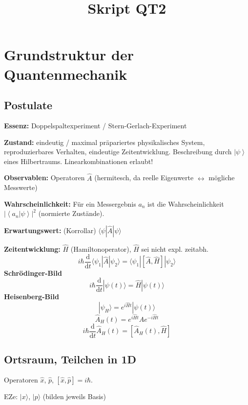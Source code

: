 \documentclass[11pt,a4paper]{report}
\title{Skript QT2}
\begin{document}
\maketitle

\tableofcontents

\chapter{Grundstruktur der Quantenmechanik}

\section{Postulate}

\textbf{Essenz:} Doppelspaltexperiment / Stern-Gerlach-Experiment\par 
\textbf{Zustand:} eindeutig / maximal präpariertes physikalisches System, reproduzierbares Verhalten, eindeutige Zeitentwicklung. Beschreibung durch $\left|\psi\right\rangle$ eines Hilbertraums. Linearkombinationen erlaubt!\par 
\textbf{Observablen:} Operatoren $\hat{A}$ (hermitesch, da reelle Eigenwerte $\leftrightarrow$ mögliche Messwerte)\par 
\textbf{Wahrscheinlichkeit:} Für ein Messergebnis $a_n$ ist die Wahrscheinlichkeit $\left|\left\langle a_n|\psi\right\rangle\right|^2$ (normierte Zustände).\par 
\textbf{Erwartungswert:} (Korrollar) $\langle\psi|\hat{A}|\psi\rangle$\par 
\textbf{Zeitentwicklung:} $\hat{H}$ (Hamiltonoperator), $\hat{H}$ sei nicht expl. zeitabh.
$$i\hbar\frac{\mathrm{d}}{\mathrm{d}t}\langle\psi_1|\hat{A}|\psi_2\rangle = \langle\psi_1|[\hat{A},\hat{H}]|\psi_2\rangle$$
\textbf{Schrödinger-Bild}
$$i\hbar\frac{\mathrm{d}}{\mathrm{d}t}|\psi (t)\rangle = \hat{H}|\psi (t)\rangle$$
\textbf{Heisenberg-Bild}
$$|\psi_H\rangle = e^{i\hat{H}t}|\psi (t)\rangle$$
$$\hat{A}_H(t)=e^{i\hat{H}t}\hat{A}e^{-i\hat{H}t}$$
$$i\hbar\frac{\mathrm{d}}{\mathrm{d}t}\hat{A}_H(t)=[\hat{A}_H(t),\hat{H}]$$

\section{Ortsraum, Teilchen in 1D}

Operatoren $\hat{x}$, $\hat{p}$, $[\hat{x},\hat{p}]=i\hbar$.\par 
EZe: $|x\rangle$, $|p\rangle$ (bilden jeweils Basis)\par 
\end{document}
